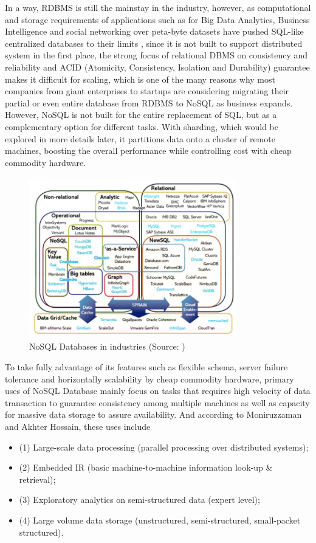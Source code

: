 In a way, RDBMS is still the mainstay in the industry, however, as computational and storage requirements of applications such as for
Big Data Analytics, Business Intelligence and social networking over peta-byte
datasets have pushed SQL-like centralized databases to their limits \cite{DBLP:journals/corr/MoniruzzamanH13}, since it is not built to support distributed system in the first place, the strong focus of relational DBMS on consistency and reliability
and ACID (Atomicity, Consistency, Isolation and
Durability)\cite{neo} guarantee makes it difficult for scaling, which is one of
the many reasons why most companies from giant enterprises to startups are considering migrating their partial or even entire database from RDBMS to NoSQL as business expands. However, NoSQL is not built for the entire replacement of SQL, but as a complementary option for different tasks.
  With sharding, which would be explored in more details later, it partitions data onto a cluster of remote machines, boosting the overall performance while controlling cost with cheap commodity hardware. \\
  
  
\begin{figure}[H]
	\includegraphics[height=7cm, width=9cm]{../../../images/nosql.png}
	\caption{NoSQL Databases in industries (Source: \cite{DBLP:journals/corr/MoniruzzamanH13})}
\end{figure}

  
To take fully advantage of its features such as flexible schema, server failure tolerance and  horizontally scalability by cheap commodity hardware, primary uses of NoSQL Database mainly focus on tasks that requires high velocity of data transaction to guarantee consistency among multiple machines as well as capacity for massive data storage to assure availability. And according to Moniruzzaman and Akhter Hossain\cite{DBLP:journals/corr/MoniruzzamanH13}, these uses include 
\begin{itemize}
\item (1) Large-scale data processing (parallel
 processing over distributed systems); 
 \item (2) Embedded IR (basic machine-to-machine
 information look-up \& retrieval); 
 \item (3) Exploratory analytics on semi-structured data (expert
 level); 
 \item (4) Large volume data storage (unstructured, semi-structured, small-packet structured).
\end{itemize}

